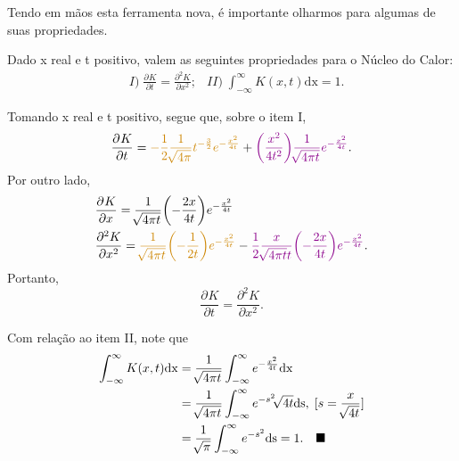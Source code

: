 \documentclass[../pde_notes.tex]{subfiles}
\begin{document}
Tendo em mãos esta ferramenta nova, é importante olharmos para algumas de suas propriedades.
\begin{prop*}
	Dado x real e t positivo, valem as seguintes propriedades para o Núcleo do Calor:
	\begin{align*}
		 & I)\; \frac{\partial^{}K}{\partial t^{}} = \frac{\partial^{2}K}{\partial x^{2}};
		 & II)\; \int_{-\infty}^{\infty}K(x, t) \mathrm{dx} = 1.
	\end{align*}
\end{prop*}
\begin{proof*}
	Tomando x real e t positivo, segue que, sobre o item I,
	\[
		\frac{\partial^{}K}{\partial t^{}} = {\color{Orange3}-\frac{1}{2}\frac{1}{\sqrt[]{4\pi }}t^{-\frac{3}{2}}e^{-\frac{x^{2}}{4t}}} + {\color{Magenta4}\biggl(\frac{x^{2}}{4t^{2}}\biggr)\frac{1}{\sqrt[]{4\pi t}}e^{-\frac{x^{2}}{4t}}}.
	\]
	Por outro lado,
	\begin{align*}
		 & \frac{\partial^{}K}{\partial x^{}} = \frac{1}{\sqrt[]{4\pi t}}\biggl(-\frac{2x}{4t}\biggr)e^{-\frac{x^{2}}{4t}}                                                                                                                               \\
		 & \frac{\partial^{2}K}{\partial x^{2}} = {\color{Orange3}\frac{1}{\sqrt[]{4\pi t}}\biggl(-\frac{1}{2t}\biggr)e^{-\frac{x^{2}}{4t}}} - {\color{Magenta4}\frac{1}{2}\frac{x}{\sqrt[]{4\pi t}t}\biggl(-\frac{2x}{4t}\biggr)e^{-\frac{x^{2}}{4t}}}.
	\end{align*}
	Portanto,
	\[
		\frac{\partial^{}K}{\partial t^{}} = \frac{\partial^{2}K}{\partial x^{2}}.
	\]

	Com relação ao item II, note que
	\begin{align*}
		\int_{-\infty}^{\infty}K(x, t) \mathrm{dx} & = \frac{1}{\sqrt[]{4\pi t}}\int_{-\infty}^{\infty}e^{-\frac{x^{2}}{4t}} \mathrm{dx}                                \\
		                                           & = \frac{1}{\sqrt[]{4\pi t}}\int_{-\infty}^{\infty}e^{-s^{2}}\sqrt[]{4t} \mathrm{ds},\; [s = \frac{x}{\sqrt[]{4t}}] \\
		                                           & = \frac{1}{\sqrt[]{\pi }}\int_{-\infty}^{\infty}e^{-s^{2}} \mathrm{ds} = 1. \quad \text{$\blacksquare$}
	\end{align*}
\end{proof*}
\end{document}
